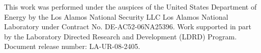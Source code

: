 \documentclass[journal,twoside]{IEEEtran}
\begin{document}
This work was performed under the auspices of the United States
Department of Energy by the Los Alamos National Security LLC Los
Alamos National Laboratory under Contract No. DE-AC52-06NA25396.  Work
supported in part by the Laboratory Directed Research and Development
(LDRD) Program.  Document release number: LA-UR-08-2405.









\end{document}

